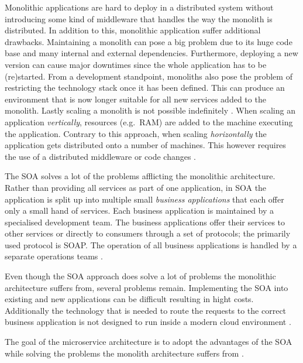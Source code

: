 Monolithic applications are hard to deploy in a distributed system without
introducing some kind of middleware that handles the way the monolith is
distributed. In addition to this, monolithic application suffer additional
drawbacks. Maintaining a monolith can pose a big problem due to its huge code
base and many internal and external dependencies. Furthermore, deploying a new
version can cause major downtimes since the whole application has to be
(re)started. From a development standpoint, monoliths also pose the problem of
restricting the technology stack once it has been defined. This can produce an
environment that is now longer suitable for all new services added to the
monolith. Lastly scaling a monolith is not possible indefinitely \autocite[p.
2]{DragoniMicroservicesyesterdaytoday2016}. When scaling an application
\textit{vertically}, resources (e.g.\ RAM) are added to the machine executing
the application. Contrary to this approach, when scaling \textit{horizontally}
the application gets distributed onto a number of machines. This however
requires the use of a distributed middleware or code changes \autocite[Ch.
1.1.1]{LuksaKubernetesAction2017}.

The \ac{SOA} solves a lot of the problems afflicting the monolithic
architecture. Rather than providing all services as part of one application, in
\ac{SOA} the application is split up into multiple small \textit{business
applications} that each offer only a small hand of services. Each business
application is maintained by a specialised development team. The business
applications offer their services to other services or directly to consumers
through a set of protocols; the primarily used protocol is \ac{SOAP}. The
operation of all business applications is handled by a separate operations
teams \autocite[p.  584]{VillamizarEvaluatingmonolithicmicroservice2015}.

Even though the \ac{SOA} approach does solve a lot of problems the monolithic
architecture suffers from, several problems remain. Implementing the \ac{SOA}
into existing and new applications can be difficult resulting in hight costs.
Additionally the technology that is needed to route the requests to the correct
business application is not designed to run inside a modern cloud environment
\autocite[p. 584]{VillamizarEvaluatingmonolithicmicroservice2015}.

The goal of the microservice architecture is to adopt the advantages of the
\ac{SOA} while solving the problems the monolith architecture suffers from
\autocite[p. 584]{VillamizarEvaluatingmonolithicmicroservice2015}.

